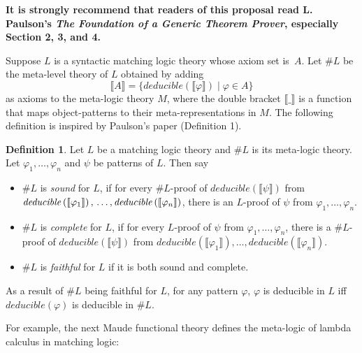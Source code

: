\documentclass[UTF8]{article}
\newcommand{\comment}[1]
    {\par {\bfseries \color{blue} #1 \par}} %
\newcounter{thmcounter}
\theoremstyle{plain}
\theoremstyle{definition}
\newtheorem{definition}[thmcounter]{Definition}
\theoremstyle{remark}
\newcommand{\Bracket}[1]
    {\llbracket#1\rrbracket}
\begin{document}
\comment{It is strongly recommend that readers of this proposal read L. 
	Paulson's \emph{The Foundation of a Generic Theorem Prover}, especially 
	Section 
	2, 3, and 4.}

Suppose $L$ is a syntactic matching logic theory whose axiom set is~$A$.
Let $\# L$ be the meta-level theory of $L$ obtained by adding 
$$\Bracket{A} = 
\{\textit{deducible}\left(\Bracket{\varphi}\right)
\mid 
\varphi \in A\}$$
as axioms to the meta-logic theory $M$,
where the double bracket $\Bracket{\_}$ is a function that maps object-patterns 
to their meta-representations in $M$. 
The following definition is inspired by Paulson's paper (Definition 1). 
\begin{definition}
	Let $L$ be a matching logic theory and $\#L$ is its meta-logic theory. 
	Let	$\varphi_1,\dots,\varphi_n$ and $\psi$ be patterns of $L$.	
	Then say
	\begin{itemize}
		\item $\#L$ is \emph{sound} for $L$, if for every $\#L$-proof of 
		$\mathit{deducible}\left(\Bracket{\psi}\right)$ from 
		$\mathit{deducible}\left(\Bracket{\varphi_1}\right),\\ \dots, 
		\mathit{deducible}\left(\Bracket{\varphi_n}\right)$, there is an 
		$L$-proof of $\psi$ from 
		$\varphi_1,\dots,\varphi_n$.
		\item $\#L$ is \emph{complete} for $L$, if for every $L$-proof of 
		$\psi$ from $\varphi_1,\dots,\varphi_n$, there is a $\#L$-proof of 
		$\mathit{deducible}\left(\Bracket{\psi}\right)$ from 
		$\mathit{deducible}\left(\Bracket{\varphi_1}\right), \dots, 
		\mathit{deducible}\left(\Bracket{\varphi_n}\right)$.
		\item $\#L$ is \emph{faithful} for $L$ if it is both sound and complete.
	\end{itemize}
    As a result of $\#L$ being faithful for $L$, for any pattern $\varphi$, 
    $\varphi$ is deducible in $L$ iff $\mathit{deducible}(\varphi)$ is 
    deducible in $\#L$.
\end{definition}


For example, the next Maude functional theory defines the meta-logic of lambda 
calculus in matching logic:
\end{document}
